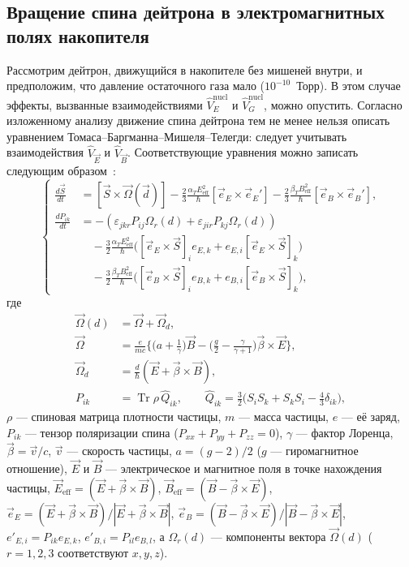 \documentclass[11pt,a4paper]{article}
\DeclareMathOperator{\Tr}{Tr}
\begin{document}
\subsection{Вращение спина дейтрона в электромагнитных полях накопителя}

Рассмотрим дейтрон, движущийся в накопителе без мишеней внутри, и предположим,
что давление остаточного газа мало ($10^{-10}$~Торр). В этом случае эффекты,
вызванные взаимодействиями $\hat{V}_E^{\mathrm{nucl}}$ и
$\hat{V}_G^{\mathrm{nucl}}$, можно опустить. Согласно изложенному анализу
движение спина дейтрона тем не менее нельзя описать уравнением
Томаса--Баргманна--Мишеля--Телегди: следует учитывать взаимодействия
$\hat{V}_{\vec{E}}$ и $\hat{V}_{\vec{B}}$. Соответствующие уравнения можно
записать следующим образом~\cite{BaryShirvel05,Bary0504064,BaryGurin05}:
\begin{equation}
\left\{
\begin{aligned}
\frac{d\vec{S}}{dt}
&=[\vec{S}\times\vec{\Omega}(\vec{d})]
-\frac23\frac{\alpha_T E_{\mathrm{eff}}^2}{\hbar}[\vec{e}_E\times\vec{e}_E']
-\frac23\frac{\beta_T B_{\mathrm{eff}}^2}{\hbar}[\vec{e}_B\times\vec{e}_B'],
\\[0.6em]
\frac{dP_{ik}}{dt}
&=-(\varepsilon_{jkr}P_{ij}\Omega_r(d)+\varepsilon_{jir}P_{kj}\Omega_r(d))
\\
&\quad
-\frac32\frac{\alpha_T E_{\mathrm{eff}}^2}{\hbar}
\bigl([\vec{e}_E\times\vec{S}]_i e_{E,k}+e_{E,i}[\vec{e}_E\times\vec{S}]_k\bigr)
\\
&\quad
-\frac32\frac{\beta_T B_{\mathrm{eff}}^2}{\hbar}
\bigl([\vec{e}_B\times\vec{S}]_i e_{B,k}+e_{B,i}[\vec{e}_B\times\vec{S}]_k\bigr),
\end{aligned}
\right.
\label{eq:31}
\end{equation}
где
\begin{equation*}
\begin{aligned}
\vec{\Omega}(d)&=\vec{\Omega}+\vec{\Omega}_d,\\
\vec{\Omega}
&=\frac{e}{mc}\Biggl\{
\Biggl(a+\frac{1}{\gamma}\Biggr)\vec{B}
-\Biggl(\frac{g}{2}-\frac{\gamma}{\gamma+1}\Biggr)\vec{\beta}\times\vec{E}
\Biggr\},\\
\vec{\Omega}_d
&=\frac{d}{\hbar}(\vec{E}+\vec{\beta}\times\vec{B}),\\
P_{ik}&=\Tr\rho\,\hat{Q}_{ik},\qquad
\hat{Q}_{ik}=\frac32\Biggl(S_i S_k+S_k S_i-\frac43\delta_{ik}\Biggr),
\end{aligned}
\end{equation*}
$\rho$ --- спиновая матрица плотности частицы, $m$ --- масса частицы,
$e$ --- её заряд, $P_{ik}$ --- тензор поляризации спина
($P_{xx}+P_{yy}+P_{zz}=0$), $\gamma$ --- фактор Лоренца,
$\vec{\beta}=\vec{v}/c$, $\vec{v}$ --- скорость частицы, $a=(g-2)/2$
($g$ --- гиромагнитное отношение), $\vec{E}$ и $\vec{B}$ --- электрическое
и магнитное поля в точке нахождения частицы,
$\vec{E}_{\mathrm{eff}}=(\vec{E}+\vec{\beta}\times\vec{B})$,
$\vec{B}_{\mathrm{eff}}=(\vec{B}-\vec{\beta}\times\vec{E})$,
$\vec{e}_E=(\vec{E}+\vec{\beta}\times\vec{B})/|\vec{E}+\vec{\beta}\times\vec{B}|$,
$\vec{e}_B=(\vec{B}-\vec{\beta}\times\vec{E})/|\vec{B}-\vec{\beta}\times\vec{E}|$,
$e'_{E,i}=P_{ik}e_{E,k}$, $e'_{B,i}=P_{il}e_{B,l}$, а $\Omega_r(d)$ ---
компоненты вектора $\vec{\Omega}(d)$ ($r=1,2,3$ соответствуют $x,y,z$).
\end{document}
